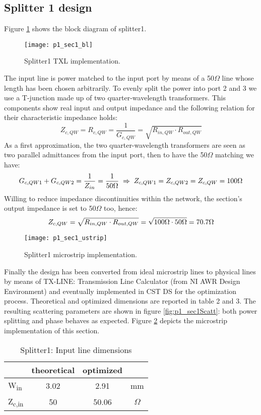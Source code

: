 \subsection{Splitter 1 design}
Figure \ref{fig:p1_sec1_block} shows the block diagram of splitter1. 
\begin{figure}[H] 
	\centering
	\texttt{[image: p1\_sec1\_bl]}
	\caption{Splitter1 TXL implementation. }
	\label{fig:p1_sec1_block}
\end{figure}
The input line is power matched to the input port by means of a 50$\Omega$ line whose length has been chosen arbitrarily. To evenly split the power into port 2 and 3 we use a T-junction made up of two quarter-wavelength transformers. This components show real input and output impedance and the following relation for their characteristic impedance holds:
\begin{equation}
	\label{eq:p1_ZcQW}
	Z_{c,QW} =R_{c,QW}=\frac{1}{G_{c,QW}}= \sqrt{R_{in,QW}\cdot R_{out,QW}} 
\end{equation}
As a first approximation, the two quarter-wavelength transformers are seen as two parallel admittances from the input port, then to have the 50$\Omega$ matching we have:
\begin{equation}
	G_{c,QW1}+G_{c,QW2}=\frac{1}{Z_{in}}=\frac{1}{50\Omega} \; \Rightarrow \; Z_{c,QW1}=Z_{c,QW2}=Z_{c,QW}=100\Omega \notag
\end{equation}
 Willing to reduce impedance discontinuities within the network, the section's output impedance is set to 50$\Omega$ too, hence:
\begin{equation}
	Z_{c,QW}= \sqrt{R_{in,QW}\cdot R_{out,QW}}=\sqrt{100\Omega\cdot 50\Omega}=70.7\Omega \notag
\end{equation}
\begin{figure}[t] 
	\centering
	\texttt{[image: p1\_sec1\_ustrip]}
	\caption{Splitter1 microstrip implementation. }
	\label{fig:p1_sec1_ustrip}
\end{figure}
Finally the design has been converted from ideal microstrip lines to physical lines by means of TX-LINE: Transmission Line Calculator (from NI AWR Design Environment) and eventually implemented in CST DS\texttrademark{} for the optimization process. 
Theoretical and optimized dimensions are reported in table 2 and 3. The resulting scattering parameters are shown in figure \ref{fig:p1_sec1Scatt}: both power splitting and phase behaves as expected. Figure \ref{fig:p1_sec1_ustrip} depicts the microstrip implementation of this section.
\begin{table} [H]
	\label{tab:p1_sec1DimIN}
	\caption{Splitter1: Input line dimensions}
	\centering	
	\begin{tabular}{lccc} 
		\toprule
			& theoretical & optimized&\\
		\midrule 
		W\textsubscript{in} 	&	3.02		&	2.91	 & mm 		\\
		Z\textsubscript{c,in}	& 	50 			& 50.06		&$\Omega$ \\
		\bottomrule
	\end{tabular}	
\end{table}
